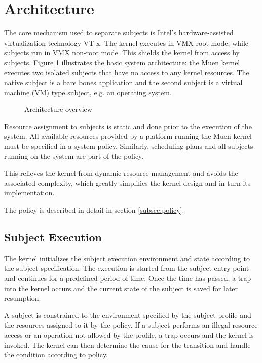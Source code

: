 \section{Architecture}\label{sec:architecture}
The core mechanism used to separate subjects is Intel's hardware-assisted
virtualization technology VT-x. The kernel executes in VMX root
mode, while subjects run in VMX non-root mode. This shields the kernel from
access by subjects. Figure \ref{fig:architecture-overview} illustrates the
basic system architecture: the Muen kernel executes two isolated subjects that
have no access to any kernel resources. The native subject is a bare bones
application and the second subject is a virtual machine (VM) type
subject, e.g. an operating system.

\begin{figure}[h]
	\centering
	
	\caption{Architecture overview}
	\label{fig:architecture-overview}
\end{figure}

Resource assignment to subjects is static and done prior to the execution of
the system. All available resources provided by a platform running the Muen
kernel must be specified in a system policy. Similarly, scheduling plans and
all subjects running on the system are part of the policy.

This relieves the kernel from dynamic resource management and avoids the
associated complexity, which greatly simplifies the kernel design and in turn
its implementation.

The policy is described in detail in section \ref{subsec:policy}.

\subsection{Subject Execution}
The kernel initializes the subject execution environment and state according to
the subject specification. The execution is started from the subject entry
point and continues for a predefined period of time. Once the time has passed,
a trap into the kernel occurs and the current state of the subject is saved for
later resumption.

A subject is constrained to the environment specified by the subject profile
and the resources assigned to it by the policy. If a subject performs an
illegal resource access or an operation not allowed by the profile, a trap
occurs and the kernel is invoked. The kernel can then determine the cause for
the transition and handle the condition according to policy.

